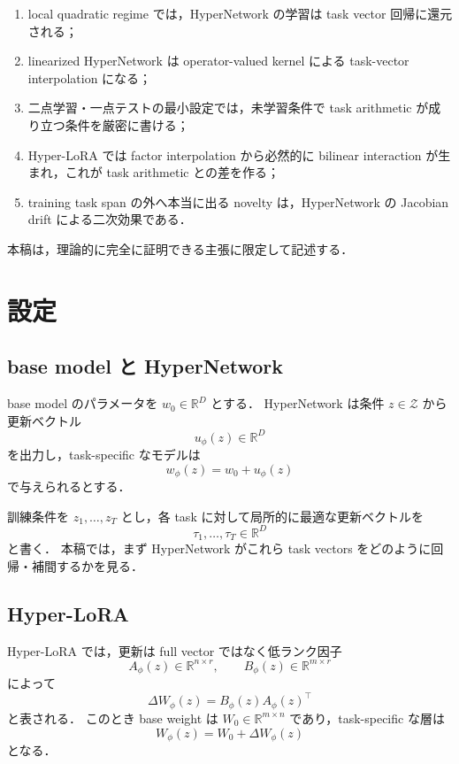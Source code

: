 \documentclass[a4paper,11pt]{bxjsarticle}
\theoremstyle{definition}
\begin{document}
\begin{enumerate}[label=(\roman*)]
    \item local quadratic regime では，HyperNetwork の学習は task vector 回帰に還元される；
    \item linearized HyperNetwork は operator-valued kernel による task-vector interpolation になる；
    \item 二点学習・一点テストの最小設定では，未学習条件で task arithmetic が成り立つ条件を厳密に書ける；
    \item Hyper-LoRA では factor interpolation から必然的に bilinear interaction が生まれ，これが task arithmetic との差を作る；
    \item training task span の外へ本当に出る novelty は，HyperNetwork の Jacobian drift による二次効果である．
\end{enumerate}

本稿は，理論的に完全に証明できる主張に限定して記述する．

\section{設定}

\subsection{base model と HyperNetwork}

base model のパラメータを $w_0 \in \mathbb{R}^D$ とする．
HyperNetwork は条件 $z \in \mathcal{Z}$ から更新ベクトル
\[
u_\phi(z)\in \mathbb{R}^D
\]
を出力し，task-specific なモデルは
\[
w_\phi(z)=w_0+u_\phi(z)
\]
で与えられるとする．

訓練条件を $z_1,\dots,z_T$ とし，各 task に対して局所的に最適な更新ベクトルを
\[
\tau_1,\dots,\tau_T \in \mathbb{R}^D
\]
と書く．
本稿では，まず HyperNetwork がこれら task vectors をどのように回帰・補間するかを見る．

\subsection{Hyper-LoRA}

Hyper-LoRA では，更新は full vector ではなく低ランク因子
\[
A_\phi(z)\in \mathbb{R}^{n\times r},\qquad
B_\phi(z)\in \mathbb{R}^{m\times r}
\]
によって
\[
\Delta W_\phi(z)=B_\phi(z)A_\phi(z)^\top
\]
と表される．
このとき base weight は $W_0\in \mathbb{R}^{m\times n}$ であり，task-specific な層は
\[
W_\phi(z)=W_0+\Delta W_\phi(z)
\]
となる．
\end{document}
